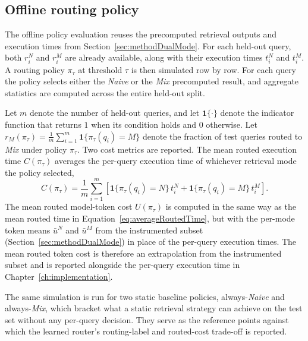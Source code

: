 \documentclass[english, bibtex]{kththesis}               %
\numberwithin{listing}{chapter}
\begin{document}
\subsection{Offline routing policy}
\label{sec:methodOfflinePolicy}

The offline policy evaluation reuses the precomputed retrieval outputs and execution times from Section~\ref{sec:methodDualMode}. For each held-out query, both \(r_i^N\) and \(r_i^M\) are already available, along with their execution times \(t_i^N\) and \(t_i^M\). A routing policy \(\pi_\tau\) at threshold \(\tau\) is then simulated row by row. For each query the policy selects either the \emph{Naive} or the \emph{Mix} precomputed result, and aggregate statistics are computed across the entire held-out split.

Let \(m\) denote the number of held-out queries, and let \(\mathbf{1}\{\cdot\}\) denote the indicator function that returns \(1\) when its condition holds and \(0\) otherwise. Let \(r_M(\pi_\tau) = \tfrac{1}{m}\sum_{i=1}^{m} \mathbf{1}\{\pi_\tau(q_i)=M\}\) denote the fraction of test queries routed to \emph{Mix} under policy \(\pi_\tau\). Two cost metrics are reported. The mean routed execution time \(C(\pi_\tau)\) averages the per-query execution time of whichever retrieval mode the policy selected,
\begin{equation}
\label{eq:averageRoutedTime}
C(\pi_\tau) =
\frac{1}{m}\sum_{i=1}^{m}
\left[
\mathbf{1}\{\pi_\tau(q_i)=N\}\,t_i^N
+ \mathbf{1}\{\pi_\tau(q_i)=M\}\,t_i^M
\right].
\end{equation}
The mean routed model-token cost \(U(\pi_\tau)\) is computed in the same way as the mean routed time in Equation~\ref{eq:averageRoutedTime}, but with the per-mode token means \(\bar{u}^N\) and \(\bar{u}^M\) from the instrumented subset (Section~\ref{sec:methodDualMode}) in place of the per-query execution times. The mean routed token cost is therefore an extrapolation from the instrumented subset and is reported alongside the per-query execution time in Chapter~\ref{ch:implementation}.

The same simulation is run for two static baseline policies, always-\emph{Naive} and always-\emph{Mix}, which bracket what a static retrieval strategy can achieve on the test set without any per-query decision. They serve as the reference points against which the learned router's routing-label and routed-cost trade-off is reported.
\end{document}
